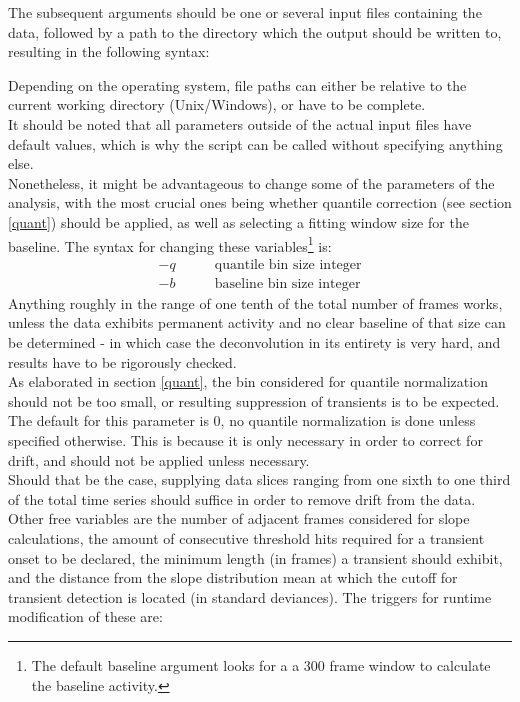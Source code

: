 \documentclass[titlepage]{article}
\begin{document}
The subsequent arguments should be one or several input files containing the data, followed by a path to the directory which the output should be written to, resulting in the following syntax:
\begin{mdframed}[backgroundcolor=black] 
\color{green}{$>>$ python main.py File1 File2 /path/to/output/directory/}
\end{mdframed}
Depending on the operating system, file paths can either be relative to the current working directory (Unix/Windows), or have to be complete.\\
It should be noted that all parameters outside of the actual input files have default values, which is why the script can be called without specifying anything else.\\
Nonetheless, it might be advantageous to change some of the parameters of the analysis, with the most crucial ones being whether quantile correction (see section \ref{quant}) should be applied, as well as selecting a fitting window size for the baseline. The syntax for changing these variables\footnote{The default baseline argument looks for a a 300 frame window to calculate the baseline activity.} is:
\begin{align*}
-q & \qquad \text{quantile bin size integer} \\
-b & \qquad \text{baseline bin size integer}
\end{align*}
Anything roughly in the range of one tenth of the total number of frames works, unless the data exhibits permanent activity and no clear baseline of that size can be determined - in which case the deconvolution in its entirety is very hard, and results have to be rigorously checked.\\
As elaborated in section \ref{quant}, the bin considered for quantile normalization should not be too small, or resulting suppression of transients is to be expected. The default for this parameter is 0, no quantile normalization is done unless specified otherwise.
This is because it is only necessary in order to correct for drift, and should not be applied unless necessary.\\
Should that be the case, supplying data slices ranging from one sixth to one third of the total time series should suffice in order to remove drift from the data.\\
Other free variables are the number of adjacent frames considered for slope calculations, the amount of consecutive threshold hits required for a transient onset to be declared, the minimum length (in frames) a transient should exhibit, and the distance from the slope distribution mean at which the cutoff for transient detection is located (in standard deviances). The triggers for runtime modification of these are:
\end{document}
